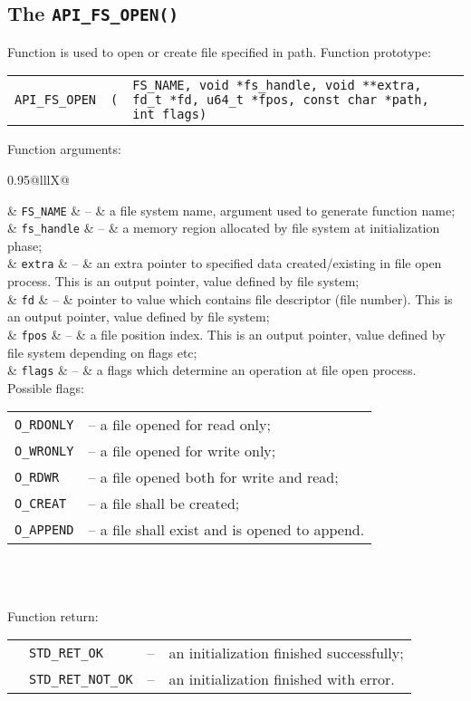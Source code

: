 \documentclass[a4paper,11pt]{report}
\makeatletter
\newcommand{\macro}[1]{\texttt{#1}}
\newcommand{\code}[1]{\texttt{#1}}
\newcommand{\prototype}[2]{
   \begin{tabularx}{\textwidth}{@{}l@{}l@{}X}
      \code{#1} & \code{(} & \code{#2)}
   \end{tabularx}
}
\newcommand{\apidescription}[5]{
   #1\newline Function prototype:
   \begin{center}
      \prototype{#2}{#3}
   \end{center}
   Function arguments:\\
   \indent
   \begin{tabularx}{0.95\textwidth}{@{}lllX@{}}
      #4
   \end{tabularx}\\[1ex]
   Function return:\\
   \indent
   \begin{tabularx}{0.95\textwidth}{@{}lllX@{}}
      #5
   \end{tabularx}
}
\newcommand{\apiarg}[2]{\textbullet & \code{#1} & -- & #2\\}
\newcommand{\apiret}[2]{\textbullet & \code{#1} & -- & #2\\}
\makeatother
\begin{document}
\subsection{The \code{API\_FS\_OPEN()}}
\apidescription
{
   Function is used to open or create file specified in path.
}
{API\_FS\_OPEN}{FS\_NAME, void *fs\_handle, void **extra, fd\_t *fd, u64\_t *fpos, const char *path, int flags}
{
   \apiarg{FS\_NAME}    {a file system name, argument used to generate function name;}
   \apiarg{fs\_handle}  {a memory region allocated by file system at initialization phase;}
   \apiarg{extra}       {an extra pointer to specified data created/existing in file open process. This
                         is an output pointer, value defined by file system;}
   \apiarg{fd}          {pointer to value which contains file descriptor (file number). This is an output
                         pointer, value defined by file system;}
   \apiarg{fpos}        {a file position index. This is an output pointer, value defined by file system
                         depending on flags etc;}
   \apiarg{flags}       {a flags which determine an operation at file open process. Possible flags:\newline
                        \begin{tabular}{@{}ll@{}}
                           \macro{O\_RDONLY} & -- a file opened for read only;\\
                           \macro{O\_WRONLY} & -- a file opened for write only;\\
                           \macro{O\_RDWR}   & -- a file opened both for write and read;\\
                           \macro{O\_CREAT}  & -- a file shall be created;\\
                           \macro{O\_APPEND} & -- a file shall exist and is opened to append.
                        \end{tabular}}
}
{
   \apiret{STD\_RET\_OK}      {an initialization finished successfully;}
   \apiret{STD\_RET\_NOT\_OK} {an initialization finished with error.}
}
\end{document}
